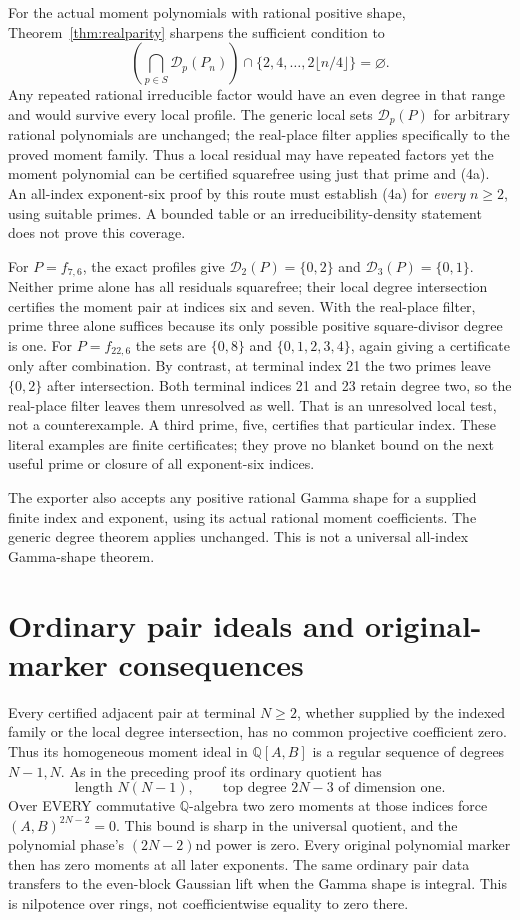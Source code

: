 \documentclass[11pt]{article}
\newcommand{\Q}{\mathbb Q}
\begin{document}
For the actual moment polynomials with rational positive shape,
Theorem~\ref{thm:realparity} sharpens the sufficient condition to
\[
 \left(\bigcap_{p\in S}\mathcal D_p(P_n)\right)
 \cap\{2,4,\ldots,2\lfloor n/4\rfloor\}=\varnothing. \tag{4a}
\]
Any repeated rational irreducible factor would have an even degree in
that range and would survive every local profile. The generic local
sets $\mathcal D_p(P)$ for arbitrary rational polynomials are unchanged;
the real-place filter applies specifically to the proved moment family.
Thus a local residual may have repeated factors yet the moment
polynomial can be certified squarefree using just that prime and (4a).
An all-index exponent-six proof by this route must establish (4a) for
\emph{every} $n\geq2$, using suitable primes. A bounded table or an
irreducibility-density statement does not prove this coverage.

For $P=f_{7,6}$, the exact profiles give
$\mathcal D_2(P)=\{0,2\}$ and $\mathcal D_3(P)=\{0,1\}$.
Neither prime alone has all residuals squarefree; their local degree
intersection certifies the moment pair at indices six and seven.
With the real-place filter, prime three alone suffices because its
only possible positive square-divisor degree is one.
For $P=f_{22,6}$ the sets are $\{0,8\}$ and
$\{0,1,2,3,4\}$, again giving a certificate only after combination.
By contrast, at terminal index 21 the two primes leave
$\{0,2\}$ after intersection. Both terminal indices 21 and 23 retain degree
two, so the real-place filter leaves them unresolved as well. That is
an unresolved local test, not a counterexample. A third prime, five, certifies that particular index.
These literal examples are finite certificates; they prove no blanket
bound on the next useful prime or closure of all exponent-six indices.

The exporter also accepts any positive rational Gamma shape for a supplied
finite index and exponent, using its actual rational moment coefficients.
The generic degree theorem applies unchanged. This is not a universal
all-index Gamma-shape theorem.

\section{Ordinary pair ideals and original-marker consequences}
Every certified adjacent pair at terminal $N\ge2$, whether supplied by
the indexed family or the local degree intersection, has no common
projective coefficient zero. Thus its homogeneous moment ideal in
$\Q[A,B]$ is a regular sequence of degrees $N-1,N$. As in the preceding
proof its ordinary quotient has
\[
 \text{length }N(N-1),\qquad
 \text{top degree }2N-3\text{ of dimension one}.
\]
Over EVERY commutative $\Q$-algebra two zero moments at those indices
force $(A,B)^{2N-2}=0$. This bound is sharp in the universal quotient,
and the polynomial phase's $(2N-2)$nd power is zero. Every original
polynomial marker then has zero moments at all later exponents. The
same ordinary pair data transfers to the even-block Gaussian lift when
the Gamma shape is integral. This is nilpotence over rings, not
coefficientwise equality to zero there.
\end{document}
